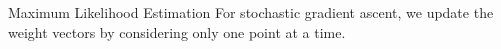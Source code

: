 \begin{frame}{Maximum Likelihood Estimation}
%
For stochastic gradient ascent, we update the weight vectors by
considering only one point at a time. 

\end{frame}

